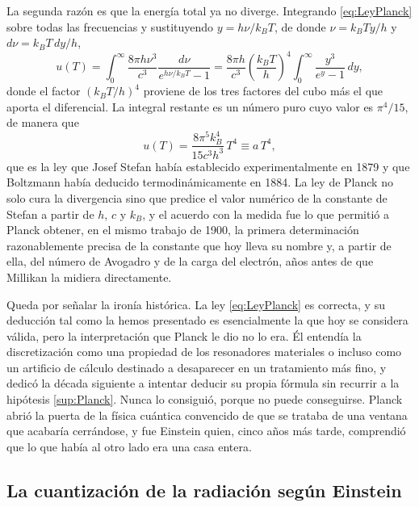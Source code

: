             La segunda razón es que la energía total ya no diverge. Integrando \eqref{eq:LeyPlanck} sobre todas las frecuencias y sustituyendo $y = h\nu/k_{B}T$, de donde $\nu = k_{B}Ty/h$ y $d\nu = k_{B}T\,dy/h$,
            \begin{equation}\label{eq:StefanPaso}
                u(T) = \int_{0}^{\infty}\frac{8\pi h\nu^{3}}{c^{3}}\frac{d\nu}{e^{h\nu/k_{B}T}-1}
                = \frac{8\pi h}{c^{3}}\left(\frac{k_{B}T}{h}\right)^{4}\int_{0}^{\infty}\frac{y^{3}}{e^{y}-1}\,dy,
            \end{equation}
            donde el factor $(k_{B}T/h)^{4}$ proviene de los tres factores del cubo más el que aporta el diferencial. La integral restante es un número puro cuyo valor es $\pi^{4}/15$, de manera que
            \begin{equation}\label{eq:StefanBoltzmann}
                u(T) = \frac{8\pi^{5}k_{B}^{4}}{15c^{3}h^{3}}\,T^{4} \equiv a\,T^{4},
            \end{equation}
            que es la ley que Josef Stefan había establecido experimentalmente en 1879 y que Boltzmann había deducido termodinámicamente en 1884. La ley de Planck no solo cura la divergencia sino que predice el valor numérico de la constante de Stefan a partir de $h$, $c$ y $k_{B}$, y el acuerdo con la medida fue lo que permitió a Planck obtener, en el mismo trabajo de 1900, la primera determinación razonablemente precisa de la constante que hoy lleva su nombre y, a partir de ella, del número de Avogadro y de la carga del electrón, años antes de que Millikan la midiera directamente.

            Queda por señalar la ironía histórica. La ley \eqref{eq:LeyPlanck} es correcta, y su deducción tal como la hemos presentado es esencialmente la que hoy se considera válida, pero la interpretación que Planck le dio no lo era. Él entendía la discretización como una propiedad de los resonadores materiales o incluso como un artificio de cálculo destinado a desaparecer en un tratamiento más fino, y dedicó la década siguiente a intentar deducir su propia fórmula sin recurrir a la hipótesis \ref{sup:Planck}. Nunca lo consiguió, porque no puede conseguirse. Planck abrió la puerta de la física cuántica convencido de que se trataba de una ventana que acabaría cerrándose, y fue Einstein quien, cinco años más tarde, comprendió que lo que había al otro lado era una casa entera.

    \subsection{La cuantización de la radiación según Einstein}

